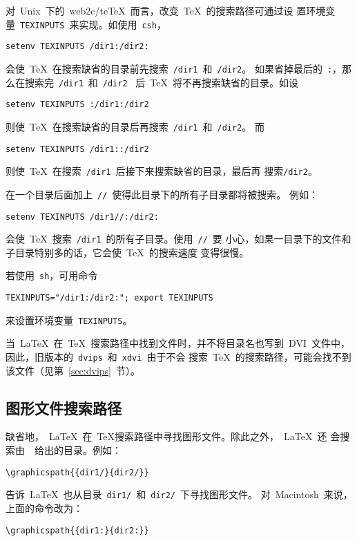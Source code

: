 对~Unix~下的~web2c/te\TeX{}~而言，改变~TeX~的搜索路径可通过设
置环境变量~\texttt{TEXINPUTS}~来实现。如使用~\texttt{csh}，
\begin{Verbatim}[xleftmargin=1cm]
setenv TEXINPUTS /dir1:/dir2:
\end{Verbatim}
会使~\TeX{}~在搜索缺省的目录前先搜索~\texttt{/dir1}~和~\texttt{/dir2}。
如果省掉最后的~\texttt{:}，那么在搜索完~\texttt{/dir1}~和~\texttt{/dir2}
~后~\TeX{}~将不再搜索缺省的目录。如设
\begin{Verbatim}[xleftmargin=1cm]
setenv TEXINPUTS :/dir1:/dir2
\end{Verbatim}
则使~\TeX{}~在搜索缺省的目录后再搜索~\texttt{/dir1}~和~\texttt{/dir2}。
而
\begin{Verbatim}[xleftmargin=1cm]
setenv TEXINPUTS /dir1::/dir2
\end{Verbatim}
则使~\TeX{}~在搜索~\texttt{/dir1}~后接下来搜索缺省的目录，最后再
搜索\texttt{/dir2}。

在一个目录后面加上~\texttt{//}~使得此目录下的所有子目录都将被搜索。
例如：
\begin{Verbatim}[xleftmargin=1cm]
setenv TEXINPUTS /dir1//:/dir2:
\end{Verbatim}
会使~\TeX{}~搜索~\texttt{/dir1}~的所有子目录。使用~\texttt{//}~要
小心，如果一目录下的文件和子目录特别多的话，它会使~\TeX{}~的搜索速度
变得很慢。

若使用~\texttt{sh}，可用命令
\begin{Verbatim}[xleftmargin=1cm]
TEXINPUTS="/dir1:/dir2:"; export TEXINPUTS
\end{Verbatim}
来设置环境变量~\texttt{TEXINPUTS}。

当~\LaTeX~在~\TeX{}~搜索路径中找到文件时，并不将目录名也写到~DVI~文件中，
因此，旧版本的~\texttt{dvips}~和~\texttt{xdvi}~由于不会
搜索~\TeX{}~的搜索路径，可能会找不到该文件（见第~\ref{sec:dvips}~节）。

\subsection{图形文件搜索路径}\label{ssec:graphpath}

缺省地，~\LaTeX{}~在~\TeX{}搜索路径中寻找图形文件。除此之外，~\LaTeX{}~还
会搜索由~~给出的目录。例如：
\begin{Verbatim}[xleftmargin=1cm]
\graphicspath{{dir1/}{dir2/}}
\end{Verbatim}
告诉~\LaTeX{}~也从目录~\texttt{dir1/}~和~\texttt{dir2/}~下寻找图形文件。
对~Macintosh~来说，上面的命令改为：
\begin{Verbatim}[xleftmargin=1cm]
\graphicspath{{dir1:}{dir2:}}
\end{Verbatim}

